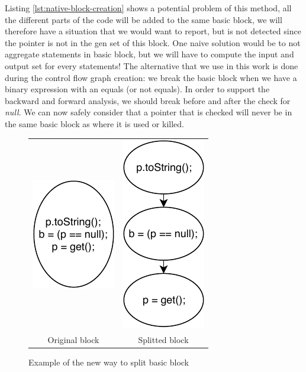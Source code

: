 Listing \ref{lst:native-block-creation} shows a potential problem of this method, all the different parts of the code will be added to the same basic block, we will therefore have a situation that we would want to report, but is not detected since the pointer is not in the gen set of this block. 
One naive solution would be to not aggregate statements in basic block, but we will have to compute the input and output set for every statements! 
The alternative that we use in this work is done during the control flow graph creation: we break the basic block when we have a binary expression with an equals (or not equals). 
In order to support the backward and forward analysis, we should break before and after the check for \emph{null}. 
We can now safely consider that a pointer that is checked will never be in the same basic block as where it is used or killed.
\begin{figure}[h]
\caption{Example of the new way to split basic block}
\label{figure:new-way-to-split}
\setlength{\tabcolsep}{24pt}
	\begin{tabular}{cc}
		\includegraphics[]{figure/original-block-cfg.pdf}  &
		\includegraphics[]{figure/splitted-block-cfg.pdf}   \\ 
		Original block & Splitted block
	\end{tabular}
\end{figure}

